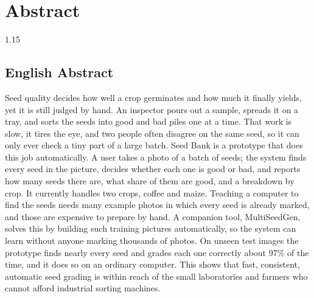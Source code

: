 \documentclass[12pt, a4paper]{report}
\begin{document}
\chapter*{Abstract}
\begin{spacing}{1.15}
\section*{English Abstract}
Seed quality decides how well a crop germinates and how much it finally yields,
yet it is still judged by hand. An inspector pours out a sample, spreads it on a
tray, and sorts the seeds into good and bad piles one at a time. That work is slow,
it tires the eye, and two people often disagree on the same seed, so it can only
ever check a tiny part of a large batch. Seed Bank is a prototype that does this
job automatically. A user takes a photo of a batch of seeds; the system finds
every seed in the picture, decides whether each one is good or bad, and reports how
many seeds there are, what share of them are good, and a breakdown by crop. It
currently handles two crops, coffee and maize. Teaching a computer to find the
seeds needs many example photos in which every seed is already marked, and those
are expensive to prepare by hand. A companion tool, MultiSeedGen, solves this by
building such training pictures automatically, so the system can learn without
anyone marking thousands of photos. On unseen test images the prototype finds
nearly every seed and grades each one correctly about 97\% of the time, and it does
so on an ordinary computer. This shows that fast, consistent, automatic seed
grading is within reach of the small laboratories and farmers who cannot afford
industrial sorting machines.

\vspace{1.5cm}


\end{spacing}
\end{document}
